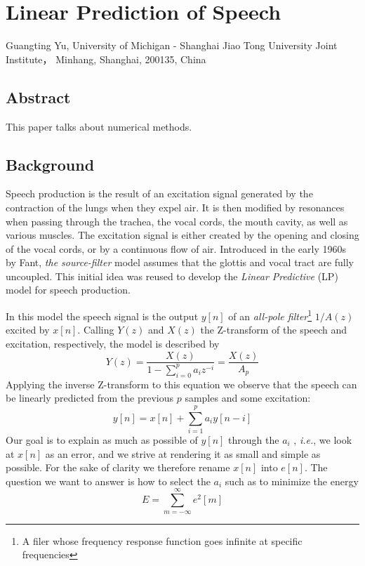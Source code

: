 \renewcommand{\chaptername}{Project}
\renewcommand{\thesection}{\arabic{section}}
\titleformat{\section}{\normalfont\large\bfseries}{\thesection}{1em}{}
\setcounter{chapter}{0}


\chapter{Linear Prediction of Speech}
\begin{center}
Guangting Yu, University of Michigan - Shanghai Jiao Tong University Joint Institute， Minhang, Shanghai, 200135, China
\end{center}


\section*{Abstract}
This paper talks about numerical methods.



\section{Background}
Speech production is the result of an excitation signal generated by the contraction of the lungs when they expel air.\cite{dutoit}
It is then modified by resonances when passing through the trachea, the vocal cords, the mouth cavity, as well as various muscles.\cite{tam59}
The excitation signal is either created by the opening and closing of the vocal cords, or by a continuous flow of air.\cite{gtm181}
Introduced in the early 1960s by Fant, \textit{the source-filter} model assumes that the glottis and vocal tract are fully uncoupled.\cite{corless}
This initial idea was reused to develop the \textit{Linear Predictive} (LP) model for speech production.\cite{tam39}

In this model the speech signal is the output \(y[n]\) of an \textit{all-pole filter}\footnote{A filer whose frequency response function goes infinite at specific frequencies} \(1/A(z)\) excited by \(x[n]\).\cite{golan}
Calling \(Y(z)\) and \(X(z)\) the Z-transform of the speech and excitation, respectively, the model is described by\cite{utm}
\[ Y(z)=\frac{X(z)}{1-\sum_{i=0}^p a_i z^{-i}}=\frac{X(z)}{A_p} \]
Applying the inverse Z-transform to this equation we observe that the speech can be linearly predicted from the previous $p$ samples and some excitation:
\[ y[n] = x[n]+\sum_{i=1}^p a_i y[n-i] \]
Our goal is to explain as much as possible of \(y[n]\) through the $a_i$ , \textit{i.e.}, we look at \(x[n]\) as an error, and we strive at rendering it as small and simple as possible.\cite{gtm135}
For the sake of clarity we therefore rename \(x[n]\) into \(e[n]\).\cite{cc12}
The question we want to answer is how to select the $a_i$ such as to minimize the energy
\[ E=\sum_{m=-\infty}^\infty e^2[m] \]

